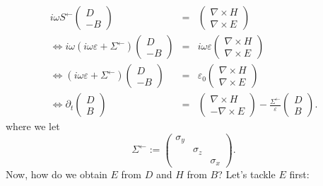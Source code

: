 \documentclass{article}
\newcommand{\assign}{:=}
\begin{document}
\begin{eqnarray*}
  i \omega S^{\leftarrow} \left(\begin{array}{c}
    D\\
    - B
  \end{array}\right) & = & \left(\begin{array}{c}
    \nabla \times H\\
    \nabla \times E
  \end{array}\right)\\
  \Leftrightarrow i \omega (i \omega \varepsilon + \Sigma^{\leftarrow})
  \left(\begin{array}{c}
    D\\
    - B
  \end{array}\right) & = & i \omega \varepsilon \left(\begin{array}{c}
    \nabla \times H\\
    \nabla \times E
  \end{array}\right)\\
  \Leftrightarrow (i \omega \varepsilon + \Sigma^{\leftarrow})
  \left(\begin{array}{c}
    D\\
    - B
  \end{array}\right) & = & \varepsilon_0 \left(\begin{array}{c}
    \nabla \times H\\
    \nabla \times E
  \end{array}\right)\\
  \Leftrightarrow \partial_t \left(\begin{array}{c}
    D\\
    B
  \end{array}\right) & = & \left(\begin{array}{c}
    \nabla \times H\\
    - \nabla \times E
  \end{array}\right) - \frac{\Sigma^{\leftarrow}}{\varepsilon}
  \left(\begin{array}{c}
    D\\
    B
  \end{array}\right) .
\end{eqnarray*}
where we let
\[ \Sigma^{\leftarrow} \assign \left(\begin{array}{ccc}
     \sigma_y &  & \\
     & \sigma_z & \\
     &  & \sigma_x
   \end{array}\right) . \]
Now, how do we obtain $E$ from $D$ and $H$ from $B$? Let's tackle $E$ first:
\end{document}

